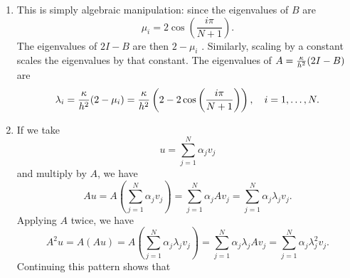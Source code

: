{\begin{solution}
\begin{enumerate}
\item This is simply algebraic manipulation: since the eigenvalues of $B$ are 
\[
\mu_i = 2\cos\left(\frac{i \pi}{N+1}\right).
\]
The eigenvalues of $2I - B$ are then $2-\mu_i$ .  Similarly, scaling by a constant scales the eigenvalues by that constant.  The eigenvalues of $A = {\kappa\over h^2}(2I-B)$ are
\[
\lambda_i = {\kappa \over h^2}(2-\mu_i) = {\kappa\over h^2}\left(2-2\cos\left(\frac{i \pi}{N+1}\right)\right), \quad i = 1,\ldots, N.
\]
\item If we take
\[
u = \sum_{j=1}^N\alpha_j v_j
\]
and multiply by $A$, we have
\[
Au = A(\sum_{j=1}^N\alpha_j v_j) = \sum_{j=1}^N \alpha_j Av_j = \sum_{j=1}^N \alpha_j \lambda_j v_j.  
\]
Applying $A$ twice, we have
\[
A^2u = A(Au) = A(\sum_{j=1}^N\alpha_j \lambda_j v_j) = \sum_{j=1}^N \alpha_j \lambda_j Av_j = \sum_{j=1}^N \alpha_j \lambda_j^2 v_j.  
\]
Continuing this pattern shows that

\end{enumerate}
\end{solution}}
